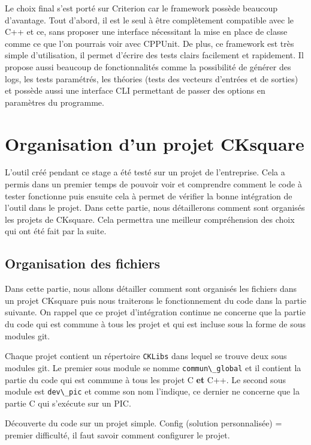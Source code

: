 \documentclass[a4paper]{article}
\begin{document}
Le choix final s'est porté sur Criterion car le framework possède beaucoup
d'avantage. Tout d'abord, il est le seul à être complètement compatible avec le
C++ et ce, sans proposer une interface nécessitant la mise en place de classe
comme ce que l'on pourrais voir avec CPPUnit. De plus, ce framework est très
simple d'utilisation, il permet d'écrire des tests clairs facilement et
rapidement. Il propose aussi beaucoup de fonctionnalités comme la possibilité de
générer des logs, les tests paramétrés, les théories (tests des vecteurs
d'entrées et de sorties) et possède aussi une interface CLI permettant de passer
des options en paramètres du programme.
\section{Organisation d'un projet CKsquare}

L'outil créé pendant ce stage a été testé sur un projet de l'entreprise. Cela a
permis dans un premier temps de pouvoir voir et comprendre comment le code à
tester fonctionne puis ensuite cela à permet de vérifier la bonne intégration de
l'outil dans le projet. Dans cette partie, nous détaillerons comment sont
organisés les projets de CKsquare. Cela permettra une meilleur compréhension des
choix qui ont été fait par la suite.

\subsection{Organisation des fichiers}

Dans cette partie, nous allons détailler comment sont organisés les fichiers
dans un projet CKsquare puis nous traiterons le fonctionnement du code dans la
partie suivante. On rappel que ce projet d'intégration continue ne concerne que
la partie du code qui est commune à tous les projet et qui est incluse sous la
forme de sous modules git.

Chaque projet contient un répertoire \lstinline{CKLibs} dans lequel se trouve
deux sous modules git. Le premier sous module se nomme \lstinline{commun\_global}
et il contient la partie du code qui est commune à tous les projet C \textbf{et}
C++. Le second sous module est \lstinline{dev\_pic} et comme son nom l'indique,
ce dernier ne concerne que la partie C qui s'exécute sur un PIC.

Découverte du code sur un projet simple.
Config (solution personnalisée) = premier difficulté, il faut savoir comment
configurer le projet.
\end{document}
